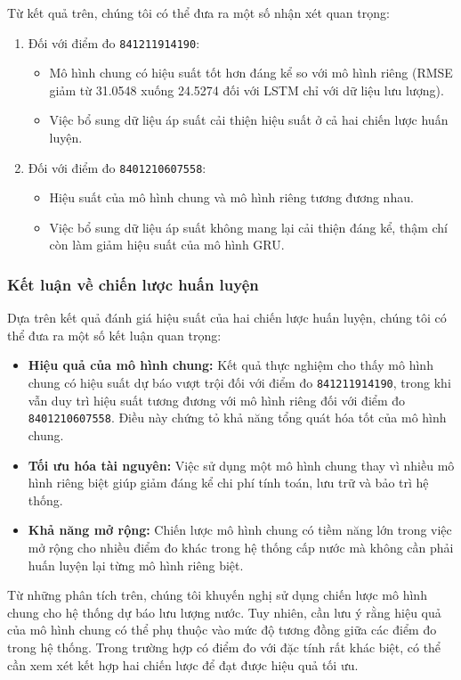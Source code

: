 Từ kết quả trên, chúng tôi có thể đưa ra một số nhận xét quan trọng:
\begin{enumerate}
    \item Đối với điểm đo \texttt{841211914190}:
    \begin{itemize}
        \item Mô hình chung có hiệu suất tốt hơn đáng kể so với mô hình riêng (RMSE giảm từ 31.0548 xuống 24.5274 đối với LSTM chỉ với dữ liệu lưu lượng).
        \item Việc bổ sung dữ liệu áp suất cải thiện hiệu suất ở cả hai chiến lược huấn luyện.
    \end{itemize}
    \item Đối với điểm đo \texttt{8401210607558}:
    \begin{itemize}
        \item Hiệu suất của mô hình chung và mô hình riêng tương đương nhau.
        \item Việc bổ sung dữ liệu áp suất không mang lại cải thiện đáng kể, thậm chí còn làm giảm hiệu suất của mô hình GRU.
    \end{itemize}
\end{enumerate}

\subsubsection{Kết luận về chiến lược huấn luyện}

Dựa trên kết quả đánh giá hiệu suất của hai chiến lược huấn luyện, chúng tôi có thể đưa ra một số kết luận quan trọng:

\begin{itemize}
    \item \textbf{Hiệu quả của mô hình chung:} Kết quả thực nghiệm cho thấy mô hình chung có hiệu suất dự báo vượt trội đối với điểm đo \texttt{841211914190}, trong khi vẫn duy trì hiệu suất tương đương với mô hình riêng đối với điểm đo \texttt{8401210607558}. Điều này chứng tỏ khả năng tổng quát hóa tốt của mô hình chung.
    
    \item \textbf{Tối ưu hóa tài nguyên:} Việc sử dụng một mô hình chung thay vì nhiều mô hình riêng biệt giúp giảm đáng kể chi phí tính toán, lưu trữ và bảo trì hệ thống.
    
    \item \textbf{Khả năng mở rộng:} Chiến lược mô hình chung có tiềm năng lớn trong việc mở rộng cho nhiều điểm đo khác trong hệ thống cấp nước mà không cần phải huấn luyện lại từng mô hình riêng biệt.
\end{itemize}

Từ những phân tích trên, chúng tôi khuyến nghị sử dụng chiến lược mô hình chung cho hệ thống dự báo lưu lượng nước. Tuy nhiên, cần lưu ý rằng hiệu quả của mô hình chung có thể phụ thuộc vào mức độ tương đồng giữa các điểm đo trong hệ thống. Trong trường hợp có điểm đo với đặc tính rất khác biệt, có thể cần xem xét kết hợp hai chiến lược để đạt được hiệu quả tối ưu.
